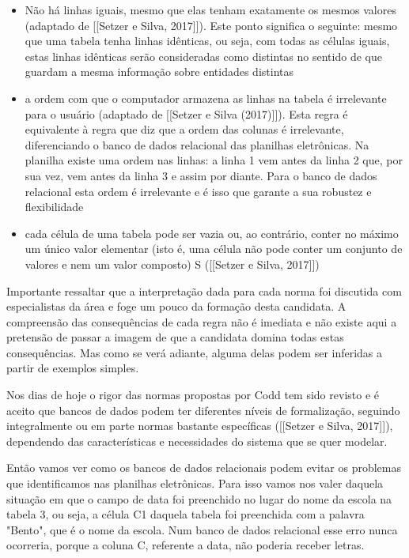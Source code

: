 \begin{itemize}
\item Não há linhas iguais, mesmo que elas tenham exatamente os mesmos valores  (adaptado de [[Setzer e Silva, 2017]]). Este ponto significa o seguinte: mesmo que uma tabela tenha linhas idênticas, ou seja, com todas as células iguais, estas linhas idênticas serão consideradas como distintas no sentido de que guardam a mesma informação sobre entidades distintas
\item a ordem com que o computador armazena as linhas na tabela é irrelevante para o usuário  (adaptado de [[Setzer e Silva (2017)]]). Esta regra é equivalente à regra que diz que a ordem das colunas é irrelevante, diferenciando o banco de dados relacional das planilhas eletrônicas. Na planilha existe uma ordem nas linhas: a linha 1 vem antes da linha 2 que, por sua vez, vem antes da linha 3 e assim por diante. Para o banco de dados relacional esta ordem é irrelevante e é isso que garante a sua robustez e flexibilidade
\item cada célula de uma tabela pode ser vazia ou, ao contrário, conter no máximo um único valor elementar (isto é, uma célula não pode conter um conjunto de valores e nem um valor composto)  S ([[Setzer e Silva, 2017]])
\end{itemize}

Importante ressaltar que a interpretação dada para cada norma foi discutida com especialistas da área e foge um pouco da formação desta candidata. A compreensão das consequências de cada regra não é imediata e não existe aqui a pretensão de passar a imagem de que a candidata domina todas estas consequências. Mas como se verá adiante, alguma delas podem ser inferidas a partir de exemplos simples.

Nos dias de hoje o rigor das normas propostas por Codd tem sido revisto e é aceito que bancos de dados podem ter diferentes níveis de formalização, seguindo integralmente ou em parte normas bastante específicas ([[Setzer e Silva, 2017]]), dependendo das características e necessidades do sistema que se quer modelar.

Então vamos ver como os bancos de dados relacionais podem evitar os problemas que identificamos nas planilhas eletrônicas. Para isso vamos nos valer daquela situação em que o campo de data foi preenchido no lugar do nome da escola na tabela 3, ou seja, a célula C1 daquela tabela foi preenchida com a palavra "Bento", que é o nome da escola. Num banco de dados relacional esse erro nunca ocorreria, porque a coluna C, referente a data, não poderia receber letras.

